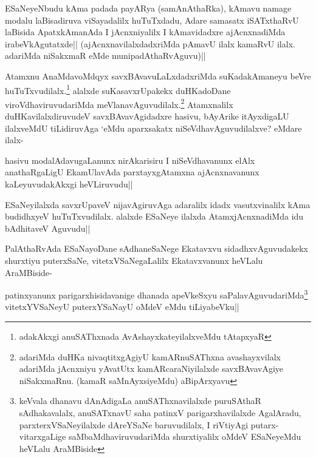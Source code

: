 
\begin{artha}
ESaNeyeNbudu kAma padada payARya (samAnAthaRka), kAmavu namage modalu laBisadiruva viSayadalilx huTuTxdadu, Adare samasatx iSATxthaRvU laBisida ApatxkAmanAda I jAcnxniyalilx I kAmavidadxre ajAcnxnadiMda irabeVkAgutatxde|| (ajAcnxnavilalxdadxriMda pAmavU ilalx kamaRvU ilalx. adariMda  niSakxmaR eMde munipadAthaRvAguvu)||
\end{artha}


\begin{artha}
Atamxnu AnaMdavoMdqyx savxBAvavuLaLxdadxriMda suKadakAmaneyu beVre huTuTxvudilalx.\footnote[1]{adakAkxgi anuSAThxnada AvAshayxkateyilalxveMdu tAtapxyaR} alalxde suKasavxrUpakekx duHKadoDane viroVdhaviruvudariMda meVlanavAguvudilalx.\footnote[2]{adariMda duHKa nivaqtitxgAgiyU kamARnuSAThxna avashayxvilalx adariMda jAcnxniyu yAvatUtx kamARcaraNiyilalxde savxBAvavAgiye niSakxmaRnu. (kamaR saMnAyxsiyeMdu) aBipArxyavu} Atamxnalilx duHKavilalxdiruvudeV savxBAvavAgidadxre hasivu, bAyArike itAyxdigaLU ilalxveMdU tiLidiruvAga `\stext eMdu aparxsakatx niSeVdhavAguvudilalxve? eMdare ilalx-
\end{artha}%

\begin{artha}
hasivu modalAdavugaLanunx nirAkarisiru I niSeVdhavanunx elAlx anathaRgaLigU EkamUlavAda parxtayxgAtamxna ajAcnxnavanunx kaLeyuvudakAkxgi heVLiruvudu||
\end{artha}

\begin{artha}
ESaNeyilalxda savxrUpaveV nijavAgiruvAga adaralilx idadx vasutxvinalilx kAma budidhxyeV huTuTxvudilalx. alalxde ESaNeye ilalxda AtamxjAcnxnadiMda idu bAdhitaveV Aguvudu||
\end{artha}

\begin{artha}
PalAthaRvAda ESaNayoDane sAdhaneSaNege Ekatavxvu sidadhxvAguvudakekx shurxtiyu puterxSaNe, vitetxVSaNegaLalilx Ekatavxvanunx heVLalu AraMBiside-
\end{artha}


\begin{artha}
patinxyanunx parigarxhisidavanige dhanada apeVkeSxyu saPalavAguvudariMda\footnote[1]{keVvala dhanavu dAnAdigaLa anuSAThxnavilalxde puruSAthaR sAdhakavalalx, anuSATxnavU saha patinxV parigarxhavilalxde AgalAradu, parxterxVSaNeyilalxde dAreYSaNe baruvudilalx, I riVtiyAgi putarx-vitarxgaLige saMbaMdhaviruvudariMda shurxtiyalilx oMdeV ESaNeyeMdu heVLalu AraMBiside} vitetxYVSaNeyU puterxYSaNayU oMdeV eMdu tiLiyabeVku||
\end{artha}

